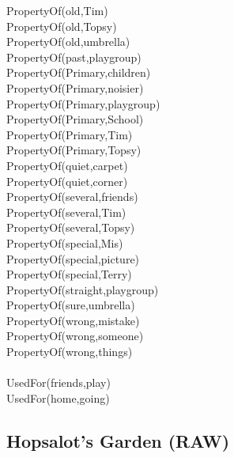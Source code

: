 \begin{multicols}{2}
\begin{footnotesize}
PropertyOf(old,Tim) \\
PropertyOf(old,Topsy) \\
PropertyOf(old,umbrella) \\
PropertyOf(past,playgroup) \\
PropertyOf(Primary,children) \\
PropertyOf(Primary,noisier) \\
PropertyOf(Primary,playgroup) \\
PropertyOf(Primary,School) \\
PropertyOf(Primary,Tim) \\
PropertyOf(Primary,Topsy) \\
PropertyOf(quiet,carpet) \\
PropertyOf(quiet,corner) \\
PropertyOf(several,friends) \\
PropertyOf(several,Tim) \\
PropertyOf(several,Topsy) \\
PropertyOf(special,Mis) \\
PropertyOf(special,picture) \\
PropertyOf(special,Terry) \\
PropertyOf(straight,playgroup) \\
PropertyOf(sure,umbrella) \\
PropertyOf(wrong,mistake) \\
PropertyOf(wrong,someone) \\
PropertyOf(wrong,things) \\
~\\
UsedFor(friends,play) \\
UsedFor(home,going) \\
\end{footnotesize}
\end{multicols}

\subsection{Hopsalot's Garden (RAW)}


